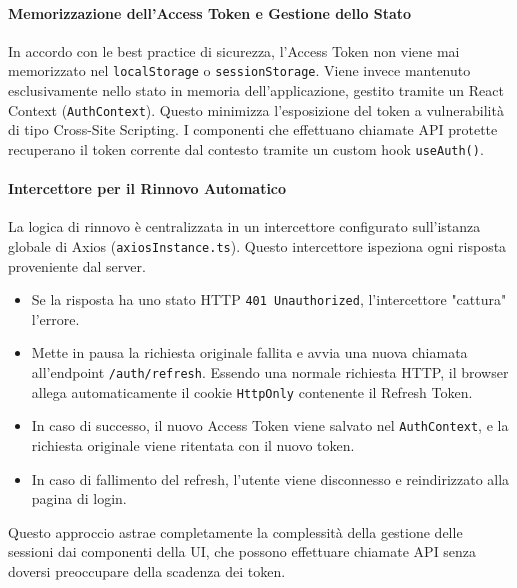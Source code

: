 \documentclass[12pt,a4paper,openright,twoside]{book}
\begin{document}
\paragraph{Memorizzazione dell'Access Token e Gestione dello Stato}
In accordo con le best practice di sicurezza, l'Access Token non viene mai memorizzato nel \texttt{localStorage} o \texttt{sessionStorage}. Viene invece mantenuto esclusivamente nello stato in memoria dell'applicazione, gestito tramite un React Context (\texttt{AuthContext}). Questo minimizza l'esposizione del token a vulnerabilità di tipo Cross-Site Scripting. I componenti che effettuano chiamate API protette recuperano il token corrente dal contesto tramite un custom hook \texttt{useAuth()}.

\paragraph{Intercettore per il Rinnovo Automatico}
La logica di rinnovo è centralizzata in un intercettore configurato sull'istanza globale di Axios (\texttt{axiosInstance.ts}). Questo intercettore ispeziona ogni risposta proveniente dal server.
\begin{itemize}
    \item Se la risposta ha uno stato HTTP \texttt{401 Unauthorized}, l'intercettore "cattura" l'errore.
    \item Mette in pausa la richiesta originale fallita e avvia una nuova chiamata all'endpoint \texttt{/auth/refresh}. Essendo una normale richiesta HTTP, il browser allega automaticamente il cookie \texttt{HttpOnly} contenente il Refresh Token.
    \item In caso di successo, il nuovo Access Token viene salvato nel \texttt{AuthContext}, e la richiesta originale viene ritentata con il nuovo token.
    \item In caso di fallimento del refresh, l'utente viene disconnesso e reindirizzato alla pagina di login.
\end{itemize}
Questo approccio astrae completamente la complessità della gestione delle sessioni dai componenti della UI, che possono effettuare chiamate API senza doversi preoccupare della scadenza dei token.
\end{document}
